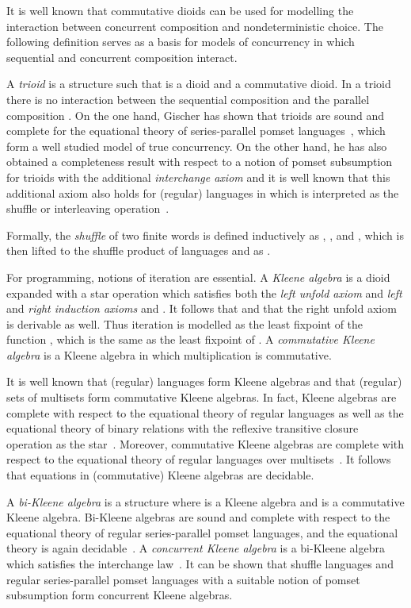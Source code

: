 \documentclass{llncs}
\begin{document}
It is well known that commutative dioids can be used for modelling the
interaction between concurrent composition and nondeterministic
choice. The following definition serves as a basis for models of
concurrency in which sequential and concurrent composition
interact.

A \emph{trioid} is a structure  such that
 is a dioid and  a commutative
dioid. In a trioid there is no interaction between the sequential
composition  and the parallel composition . On the one
hand, Gischer has shown that trioids are sound and complete for the
equational theory of series-parallel pomset languages~\cite{gischer_equational_1988},
which form a well studied model of true concurrency. On the other
hand, he has also obtained a completeness result with respect to a
notion of pomset subsumption for trioids with the additional
\emph{interchange axiom}  and it is well known that this additional axiom also
holds for (regular) languages in which  is interpreted as the
shuffle or interleaving operation~\cite{gischer_shuffle_1981}.

Formally, the \emph{shuffle}  of two finite words is defined
inductively as , , and
, which is then lifted to the
shuffle product of languages  and  as .

For programming, notions of iteration are essential. A \emph{Kleene
  algebra} is a dioid expanded with a star operation which satisfies
both the \emph{left unfold axiom}  and
\emph{left} and \emph{right induction axioms}  and . It follows that 
and that the right unfold axiom  is
derivable as well. Thus iteration  is modelled as the least
fixpoint of the function , which is the same as
the least fixpoint of . A \emph{commutative
  Kleene algebra} is a Kleene algebra in which multiplication is
commutative.

It is well known that (regular) languages form Kleene algebras and
that (regular) sets of multisets form commutative Kleene algebras. In
fact, Kleene algebras are complete with respect to the equational
theory of regular languages as well as the equational theory of binary
relations with the reflexive transitive closure operation as the
star~\cite{kozen_completeness_1994}. Moreover, commutative Kleene
algebras are complete with respect to the equational theory of regular
languages over multisets~\cite{conway_regular_1971}. It follows that
equations in (commutative) Kleene algebras are decidable.

A \emph{bi-Kleene algebra} is a structure
 where
 is a Kleene algebra and
 is a commutative Kleene
algebra. Bi-Kleene algebras are sound and complete with respect to the
equational theory of regular series-parallel pomset languages, and the
equational theory is again decidable~\cite{laurence_completeness_2013}. A
\emph{concurrent Kleene algebra} is a bi-Kleene algebra which
satisfies the interchange law~\cite{hoare_concurrent_2011}. It can be shown that
shuffle languages and regular series-parallel pomset languages with a
suitable notion of pomset subsumption form concurrent Kleene algebras.
\end{document}
